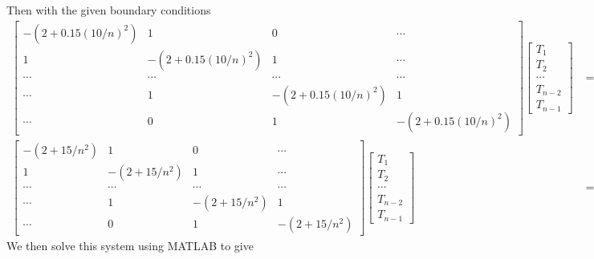 \documentclass{article}
\begin{document}
\begin{solution}
Then with the given boundary conditions
\begin{align*}
\begin{bmatrix}
-(2+0.15(10/n)^{2})	&	1	&	0	&\cdots	\\
1	&	-(2+0.15(10/n)^{2})	&	1	&\cdots	\\
\cdots	&	\cdots	&	\cdots	&	\cdots	\\
\cdots	&	1	&	-(2+0.15(10/n)^{2})	&	1\\
\cdots	&	0	&	1	&	-(2+0.15(10/n)^{2})
\end{bmatrix}
\begin{bmatrix}
T_{1}\\
T_{2}\\
\cdots\\
T_{n-2}\\
T_{n-1}
\end{bmatrix}
&=
\begin{bmatrix}
-240\\
0\\
\cdots\\
0\\
-150\\
\end{bmatrix}
\\
\begin{bmatrix}
-(2+15/n^{2})	&	1	&	0	&\cdots	\\
1	&	-(2+15/n^{2})	&	1	&\cdots	\\
\cdots	&	\cdots	&	\cdots	&	\cdots	\\
\cdots	&	1	&	-(2+15/n^{2})	&	1\\
\cdots	&	0	&	1	&	-(2+15/n^{2})
\end{bmatrix}
\begin{bmatrix}
T_{1}\\
T_{2}\\
\cdots\\
T_{n-2}\\
T_{n-1}
\end{bmatrix}
&=
\begin{bmatrix}
-240\\
0\\
\cdots\\
0\\
-150\\
\end{bmatrix}
\end{align*}
We then solve this system using MATLAB to give\\

\end{solution}
\end{document}
